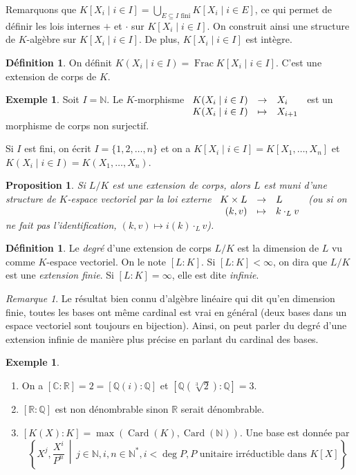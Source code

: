 \documentclass{article}
\newcommand{\N}{\mathbb{N}}
\newcommand{\Q}{\mathbb{Q}}
\newcommand{\R}{\mathbb{R}}
\newcommand{\C}{\mathbb{C}}
\DeclareMathOperator{\Card}{Card}
\DeclareMathOperator{\Frac}{Frac}
\newcommand{\midbar}{\, \middle|\,}
\newcommand{\applic}[4]{\begin{array}[t]{rcl}
#1 & \to & #2 \\
#3 & \mapsto & #4
\end{array}}
\theoremstyle{plain}
\newtheorem{proposition}[theorem]{Proposition}
\theoremstyle{definition}
\newtheorem{definition}[theorem]{Définition}
\newtheorem{example}[theorem]{Exemple}
\theoremstyle{remark}
\newtheorem*{remark}{Remarque}
\begin{document}
Remarquons que  $K[X_i \mid i\in I] = \bigcup\limits_{E \subseteq I \text{ fini}} K[X_i \mid i \in E]$, ce qui permet de définir les lois internes $+$ et $\cdot$ sur $K[X_i \mid i\in I]$. On construit ainsi une structure de $K$-algèbre sur $K[X_i \mid i\in I]$. De plus, $K[X_i \mid i\in I]$ est intègre.

\begin{definition}
    On définit $K(X_i \mid i \in I) = \Frac K[X_i \mid i\in I]$. C'est une extension de corps de $K$.
\end{definition}

\begin{example}
    Soit $I = \N$. Le $K$-morphisme $\applic{K(X_i \mid i \in I)}{X_i}{K(X_i \mid i \in I)}{X_{i+1}}$ est un morphisme de corps non surjectif.
\end{example}

Si $I$ est fini, on écrit $I = \{1,2,\dots,n\}$ et on a $K[X_i \mid i\in I] = K[X_1,\dots,X_n]$ et $K(X_i \mid i \in I) = K(X_1,\dots,X_n)$.

\begin{proposition}
    Si $L/K$ est une extension de corps, alors $L$ est muni d'une structure de $K$-espace vectoriel par la loi externe $\applic{K\times L}{L}{(k,v)}{k \cdot_L v}$ (ou si on ne fait pas l'identification, $(k,v) \mapsto i(k)\cdot_L v$).
\end{proposition}

\begin{definition}
    Le \emph{degré} d'une extension de corps $L/K$ est la dimension de $L$ vu comme $K$-espace vectoriel. On le note $[L : K]$. Si $[L : K] < \infty$, on dira que $L/K$ est une \emph{extension finie}. Si $[L : K] = \infty$, elle est dite \emph{infinie}.
\end{definition}

\begin{remark}
    Le résultat bien connu d'algèbre linéaire qui dit qu'en dimension finie, toutes les bases ont même cardinal est vrai en général (deux bases dans un espace vectoriel sont toujours en bijection). Ainsi, on peut parler du degré d'une extension infinie de manière plus précise en parlant du cardinal des bases.
\end{remark}

\begin{example} \leavevmode
    \begin{enumerate}
        \item On a $[\C : \R] = 2 = [\Q(i) : \Q]$ et $[\Q(\sqrt[3]{2}) : \Q] = 3$.
        \item $[\R : \Q]$ est non dénombrable sinon $\R$ serait dénombrable.
        \item $[K(X): K] = \max (\Card(K),\Card(\N))$. Une base est donnée par
        \[\left\{X^j, \frac{X^i}{P^n} \midbar j \in \N, i,n \in \N^*, i < \deg P, P \text{ unitaire irréductible dans } K[X]\right\}\]
    \end{enumerate}
\end{example}
\end{document}
